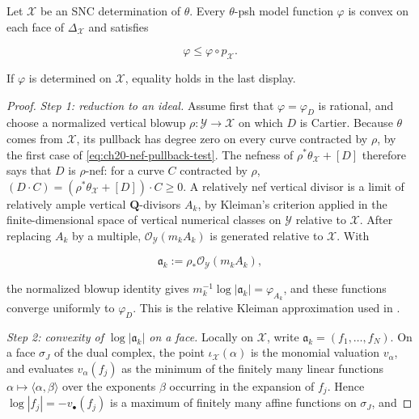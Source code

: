 \begin{lemma}\label{lem:ch21-model-skeletal-properties}
Let \(\mathcal X\) be an SNC determination of \(\theta\).  Every
\(\theta\)-psh model function \(\varphi\) is convex on each face of
\(\Delta_{\mathcal X}\) and satisfies

\[
                 \varphi\leq\varphi\circ p_{\mathcal X}.
\]

If \(\varphi\) is determined on \(\mathcal X\), equality holds in the last
display.
\end{lemma}

\begin{proof}
\emph{Step 1: reduction to an ideal.}  Assume first that
\(\varphi=\varphi_D\) is rational, and choose a normalized
vertical blowup
\(\rho:\mathcal Y\to\mathcal X\) on which \(D\) is Cartier.  Because
\(\theta\) comes from \(\mathcal X\), its pullback has degree zero on every
curve contracted by \(\rho\), by the first case of
\eqref{eq:ch20-nef-pullback-test}.  The nefness of
\(\rho^*\theta_{\mathcal X}+[D]\) therefore says that \(D\) is
\(\rho\)-nef: for a curve \(C\) contracted by \(\rho\),
\((D\cdot C)=(\rho^*\theta_{\mathcal X}+[D])\cdot C\geq0\).  A relatively
nef vertical divisor is a limit of relatively
ample vertical \(\mathbf Q\)-divisors \(A_k\), by Kleiman's criterion
applied in the finite-dimensional space of vertical numerical classes on
\(\mathcal Y\) relative to \(\mathcal X\).  After
replacing \(A_k\) by a
multiple, \(\mathcal O_{\mathcal Y}(m_kA_k)\) is generated relative to
\(\mathcal X\).  With

\[
       \mathfrak a_k:=\rho_*
          \mathcal O_{\mathcal Y}(m_kA_k),
\]

the normalized blowup identity gives
\(m_k^{-1}\log|\mathfrak a_k|=\varphi_{A_k}\), and these functions converge
uniformly to \(\varphi_D\).  This is the relative Kleiman approximation used
in \cite[\S5.2]{BFJ16}.

\emph{Step 2: convexity of \(\log|\mathfrak a_k|\) on a face.}  Locally on
\(\mathcal X\), write \(\mathfrak a_k=(f_1,\ldots,f_N)\).  On a face
\(\sigma_J\) of the dual complex, the point \(\iota_{\mathcal X}(\alpha)\)
is the monomial valuation \(v_\alpha\), and
 evaluates \(v_\alpha(f_j)\) as the minimum of the
finitely many linear functions \(\alpha\mapsto\langle\alpha,\beta\rangle\)
over the exponents \(\beta\) occurring in the expansion of \(f_j\).  Hence
\(\log|f_j|=-v_\bullet(f_j)\) is a maximum of finitely many affine
functions on \(\sigma_J\), and


\end{proof}
